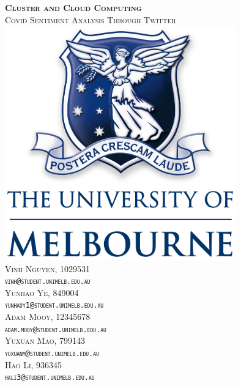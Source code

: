 \begin{titlepage}


\center %
 
\vfill
\textsc{\large\textbf{Cluster and Cloud Computing} \\[1cm]\LARGE{Covid Sentiment Analysis Through Twitter }}
\vfill
\includegraphics[width=10cm]{images/unimelblogo.png}
\vfill
\vspace{5mm}\\
\textsc{ Vinh Nguyen, 1029531\\
    \texttt{vinh@student.unimelb.edu.au} }\\
    \vspace{5mm}
\textsc{ Yunhao Ye, 849004\\
    \texttt{yunhaoy1@student.unimelb.edu.au}}\\
        \vspace{5mm}
\textsc{ Adam Mooy, 12345678\\
    \texttt{adam.mooy@student.unimelb.edu.au}}\\
    \vspace{5mm}
\textsc{ Yuxuan Mao, 799143\\
    \texttt{yuxuanm@student.unimelb.edu.au}}\\
    \vspace{5mm}
\textsc{ Hao Li, 936345\\
    \texttt{hali3@student.unimelb.edu.au}}
\end{titlepage}
